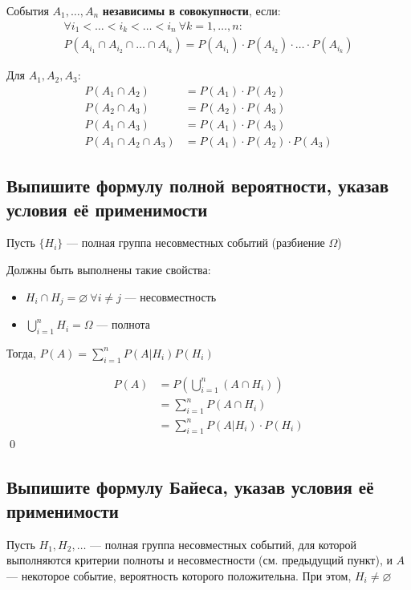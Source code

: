 \documentclass{article}
\begin{document}
 События $A_1,\ldots, A_n$ \textbf{независимы в совокупности}, если:
\begin{equation*}
    \begin{aligned}
    \forall i_1<\ldots<i_k<\ldots<i_n\ \forall k=1,\ldots,n:\\ P(A_{i_1}\cap A_{i_2}\cap\ldots\cap A_{i_k})=P(A_{i_1})\cdot P(A_{i_2})\cdot \ldots\cdot P(A_{i_k})
    \end{aligned}
\end{equation*}

\comment  Для $A_1,A_2,A_3$:
\begin{equation*}
    \begin{aligned}
        P(A_1\cap A_2)&=P(A_1)\cdot P(A_2)\\
        P(A_2\cap A_3)&=P(A_2)\cdot P(A_3)\\
        P(A_1\cap A_3)&=P(A_1)\cdot P(A_3)\\
        P(A_1\cap A_2\cap A_3)&=P(A_1)\cdot P(A_2)\cdot P(A_3)
    \end{aligned}
\end{equation*}

\subsection{Выпишите формулу полной вероятности, указав условия её применимости}
Пусть $\{H_i\}$ — полная группа несовместных событий (разбиение $\Omega$)

Должны быть выполнены такие свойства:
\begin{itemize}
    \item $H_i\cap H_j=\varnothing\ \forall i\ne j$ — несовместность\\[1mm]
    \item $\displaystyle\bigcup_{i=1}^{n}H_i=\Omega$ — полнота
\end{itemize}

\theorem Тогда, $P(A)=\sum_{i=1}^{n}P(A|H_i)P(H_i)$

\proof
\begin{equation*}
    \begin{aligned}
        P(A)&=P\left(\bigcup_{i=1}^{n}(A\cap H_i)\right)\\
        &=\sum_{i=1}^{n}P(A\cap H_i)\\
        &=\sum_{i=1}^{n} P(A|H_i)\cdot P(H_i)
    \end{aligned}
\end{equation*}\qed

\subsection{Выпишите формулу Байеса, указав условия её применимости}
Пусть $H_1, H_2, \ldots$ — полная группа несовместных событий, для которой выполняются критерии полноты и несовместности (см. предыдущий пункт), и $A$ — некоторое событие, вероятность которого положительна. При этом, $H_i\ne\varnothing$
\end{document}
